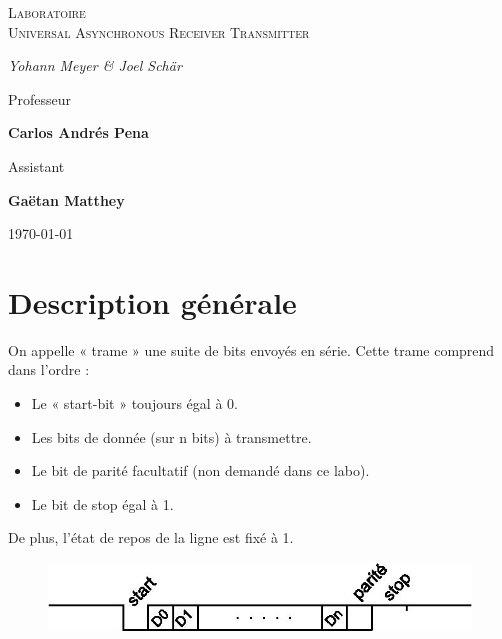 \documentclass[a4paper]{article} %
\begin{document}
\begin{titlepage}
	\centering
	
	{\scshape\LARGE \color{Monokaimagenta} Laboratoire \\ Universal Asynchronous Receiver Transmitter \par}
	
	\vspace{1cm}
	
	{\Large\itshape Yohann Meyer \& Joel Schär\par}
	
	\vfill
	Professeur\par
	\textbf{Carlos Andrés Pena} \par%
	\vspace{1cm}
	Assistant\par
	\textbf{Gaëtan Matthey}
	
	\vfill

	{\large \today\par}
	
\end{titlepage}

\section{Description générale}
On appelle « trame » une suite de bits envoyés en série. Cette trame comprend dans l’ordre :
\begin{itemize}
\item Le « start-bit » toujours égal à 0.
\item Les bits de donnée (sur n bits) à transmettre.
\item Le bit de parité facultatif (non demandé dans ce labo).
\item Le bit de stop égal à 1.
\end{itemize}
De plus, l’état de repos de la ligne est fixé à 1.
\\ 
\begin{figure}[H]
    \centering
    \includegraphics[width=.8\textwidth]{src/uart_1.jpg}
    \label{fig:trame}
\end{figure}
\end{document}
